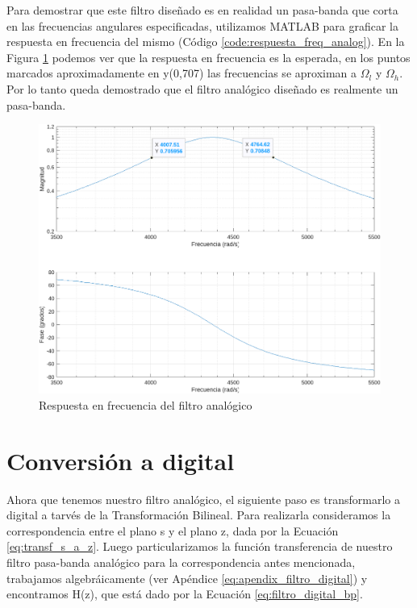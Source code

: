 Para demostrar que este filtro diseñado es en realidad un pasa-banda que corta en las frecuencias angulares especificadas, utilizamos MATLAB para graficar la respuesta en frecuencia del mismo (Código \ref{code:respuesta_freq_analog}). En la Figura \ref{fig:respuesta_freq_analog} podemos ver que la respuesta en frecuencia es la esperada, en los puntos marcados aproximadamente en y(0,707) las frecuencias se aproximan a $\Omega_l$ y $\Omega_h$. Por lo tanto queda demostrado que el filtro analógico diseñado es realmente un pasa-banda.



\begin{figure}[H]
  \centering
  \includegraphics[width=\linewidth]{images/respuesta_frecuencia_analog.png}
  \caption{Respuesta en frecuencia del filtro analógico}
  \label{fig:respuesta_freq_analog}
\end{figure}

\section{Conversión a digital}
Ahora que tenemos nuestro filtro analógico, el siguiente paso es transformarlo a digital a tarvés de la Transformación Bilineal. Para realizarla consideramos la correspondencia entre el plano s y el plano z, dada por la Ecuación \ref{eq:transf_s_a_z}. Luego particularizamos la función transferencia de nuestro filtro pasa-banda analógico para la correspondencia antes mencionada, trabajamos algebráicamente (ver Apéndice \ref{eq:apendix_filtro_digital}) y encontramos H(z), que está dado por la Ecuación \ref{eq:filtro_digital_bp}.

